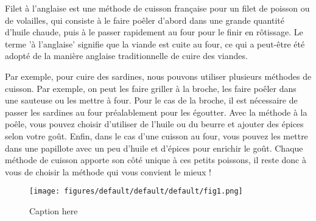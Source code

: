 Filet à l'anglaise est une méthode de cuisson française pour un filet de poisson ou de volailles, qui consiste à le faire poêler d'abord dans une grande quantité d'huile chaude, puis à le passer rapidement au four pour le finir en rôtissage. Le terme 'à l'anglaise' signifie que la viande est cuite au four, ce qui a peut-être été adopté de la manière anglaise traditionnelle de cuire des viandes.

Par exemple, pour cuire des sardines, nous pouvons  utiliser plusieurs méthodes de cuisson. Par exemple, on peut les faire griller à la broche, les faire poêler dans une sauteuse ou les mettre à four. Pour le cas de la broche, il est nécessaire de passer les sardines au four préalablement pour les égoutter. Avec la méthode à la poêle, vous pouvez choisir d'utiliser de l'huile ou du beurre et ajouter des épices selon votre goût. Enfin, dans le cas d'une cuisson au four, vous pouvez les mettre dans une papillote avec un peu d'huile et d'épices pour enrichir le goût. Chaque méthode de cuisson apporte son côté unique à ces petits poissons, il reste donc à vous de choisir la méthode qui vous convient le mieux !


\begin{figure}[h!]
    \centering
    \texttt{[image: figures/default/default/default/fig1.png]}
    \caption{Caption here}
    \label{fig:default_default_1}
\end{figure}




